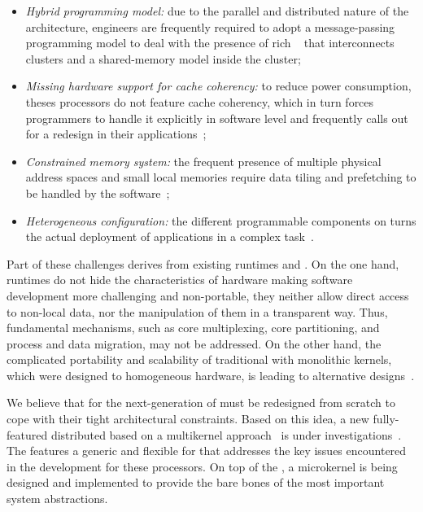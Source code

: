 	\begin{itemize}
		\item \textit{Hybrid programming model:} due to the parallel and
		distributed nature of the architecture, engineers are frequently
		required to adopt a message-passing programming model to deal
		with the presence of rich \nocs~\cite{kelly2013} that
		interconnects clusters and a shared-memory model inside the
		cluster;

		\item \textit{Missing hardware support for cache coherency:} to
		reduce power consumption, theses processors do not feature cache
		coherency, which in turn forces programmers to handle it
		explicitly in software level and frequently calls out for a
		redesign in their applications~\cite{francesquini2015};

		\item \textit{Constrained memory system:} the frequent presence
		of multiple physical address spaces and small local memories
		require data tiling and prefetching to be handled by the
		software~\cite{Castro2016};

		\item \textit{Heterogeneous configuration:} the different
		programmable components on \lightweight \manycores turns the
		actual deployment of applications in a complex
		task~\cite{barbalace2015}.
	\end{itemize}

	Part of these challenges derives from existing runtimes and \oss.
	On the one hand, runtimes do not hide the characteristics of hardware
	making software development more challenging and non-portable, \eg they
	neither allow direct access to non-local data, nor the manipulation of
	them in a transparent way. Thus, fundamental \os mechanisms, such
	as core multiplexing, core partitioning, and process and data
	migration, may not be addressed. On the other hand, the complicated
	portability and scalability of traditional \oss with monolithic
	kernels, which were designed to homogeneous hardware, is leading to
	alternative \os designs~\cite{Baumann2009, kluge2014, nightingale2009, rhoden2011}.

	We believe that \oss for the next-generation of \lightweight
	\manycores must be redesigned from scratch to cope with their tight
	architectural constraints. Based on this idea, a new fully-featured
	distributed \os based on a multikernel approach~\cite{Baumann2009}
	is under investigations~\cite{penna2017-1,penna2017-2,penna2019}.
	The \textit{\nanvixmultikernel} features a generic and flexible \hal for
	\lightweight \manycores that addresses the key issues encountered in
	the development for these processors. On top of the \textit{\nanvixhal},
	a microkernel is being designed and implemented to provide the bare bones
	of the most important system abstractions.

